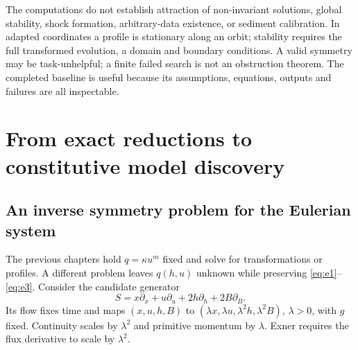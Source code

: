 \documentclass[11pt,a4paper,oneside]{report}
\numberwithin{equation}{chapter}
\begin{document}
The computations do not establish attraction of non-invariant solutions,
global stability, shock formation, arbitrary-data existence, or sediment
calibration. In adapted coordinates a profile is stationary along an orbit;
stability requires the full transformed evolution, a domain and boundary
conditions. A valid symmetry may be task-unhelpful; a finite failed search
is not an obstruction theorem. The completed baseline is useful because
its assumptions, equations, outputs and failures are all inspectable.



\chapter{From exact reductions to constitutive model discovery}\label{ch:outlook}
\section{An inverse symmetry problem for the Eulerian system}
The previous chapters hold $q=\kappa u^m$ fixed and solve for transformations or profiles. A different problem leaves $q(h,u)$ unknown while preserving \eqref{eq:e1}--\eqref{eq:e3}. Consider the candidate generator
\begin{equation}\label{eq:euler-scale}
S=x\partial_x+u\partial_u+2h\partial_h+2B\partial_B.
\end{equation}
Its flow fixes time and maps $(x,u,h,B)$ to $(\lambda x,\lambda u,\lambda^2h,\lambda^2B)$, $\lambda>0$, with $g$ fixed. Continuity scales by $\lambda^2$ and primitive momentum by $\lambda$. Exner requires the flux derivative to scale by $\lambda^2$.
\end{document}
